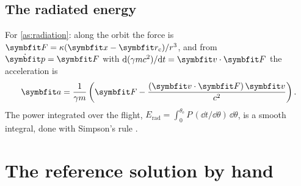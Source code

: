 \documentclass{leveldoc}
\begin{document}
\subsection{The radiated energy}

For \ref{as:radiation}: along the orbit the force is
$\vect{F} = \kappa(\vect{x}-\vect{r}_\mathrm{c})/r^3$, and from $\dot{\vect{p}} = \vect{F}$ with
$\dd(\gamma mc^2)/\dd t = \vect{v}\cdot\vect{F}$ the acceleration is
\begin{equation}\label{eq:acceleration}
  \vect{a} = \frac{1}{\gamma m}\left(\vect{F} - \frac{(\vect{v}\cdot\vect{F})\,\vect{v}}{c^2}\right).
\end{equation}
The power  integrated over the flight,
$E_\mathrm{rad} = \int_0^{\theta_\mathrm{e}} P\,(\dd t/\dd\theta)\,\dd\theta$, is a smooth
integral, done with Simpson's rule .

\section{The reference solution by hand}\label{sec:hand}
\end{document}
